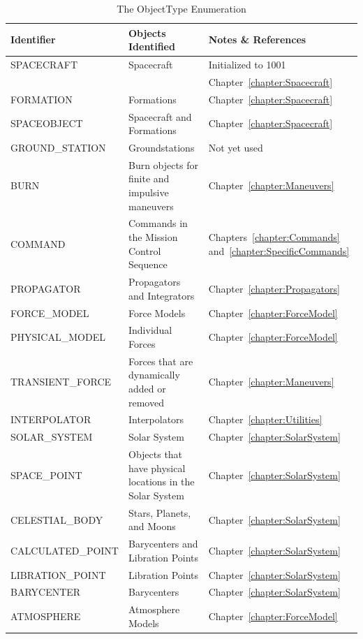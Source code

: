 \begin{table}[htb]
\begin{center}
\caption{\label{table:ObjectTypeEnum}The ObjectType Enumeration}
\setlength\extrarowheight{2pt}
\begin{tabular}{|p{1.68in}|p{2.5in}|p{1.65in}|}
\hline
Identifier & Objects Identified & Notes \& References \\
\hline
\hline
SPACECRAFT & Spacecraft & Initialized to 1001\\ & & Chapter~\ref{chapter:Spacecraft} \\
FORMATION & Formations & Chapter~\ref{chapter:Spacecraft} \\
SPACEOBJECT & Spacecraft and Formations & Chapter~\ref{chapter:Spacecraft} \\
GROUND\_STATION & Groundstations & Not yet used \\
BURN & Burn objects for finite and impulsive maneuvers & Chapter~\ref{chapter:Maneuvers} \\
COMMAND & Commands in the Mission Control Sequence & Chapters~\ref{chapter:Commands}
and~\ref{chapter:SpecificCommands} \\
PROPAGATOR & Propagators and Integrators & Chapter~\ref{chapter:Propagators} \\
FORCE\_MODEL & Force Models & Chapter~\ref{chapter:ForceModel} \\
PHYSICAL\_MODEL & Individual Forces & Chapter~\ref{chapter:ForceModel} \\
TRANSIENT\_FORCE & Forces that are dynamically added or removed & Chapter~\ref{chapter:Maneuvers} \\
INTERPOLATOR & Interpolators & Chapter~\ref{chapter:Utilities} \\
SOLAR\_SYSTEM & Solar System & Chapter~\ref{chapter:SolarSystem} \\
SPACE\_POINT & Objects that have physical locations in the Solar System &
Chapter~\ref{chapter:SolarSystem} \\
CELESTIAL\_BODY & Stars, Planets, and Moons & Chapter~\ref{chapter:SolarSystem} \\
CALCULATED\_POINT & Barycenters and Libration Points & Chapter~\ref{chapter:SolarSystem} \\
LIBRATION\_POINT & Libration Points & Chapter~\ref{chapter:SolarSystem} \\
BARYCENTER & Barycenters & Chapter~\ref{chapter:SolarSystem} \\
ATMOSPHERE & Atmosphere Models & Chapter~\ref{chapter:ForceModel} \\

\end{tabular}
\end{center}
\end{table}
